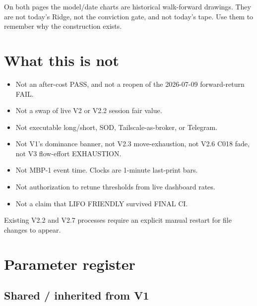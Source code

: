 \documentclass[11pt]{article}
\begin{document}
On both pages the model/date charts are historical walk-forward
drawings.  They are not today's Ridge, not the conviction gate,
and not today's tape.  Use them to remember why the construction
exists.


\section{What this is not}

\begin{itemize}
    \item Not an after-cost PASS, and not a reopen of the
    2026-07-09 forward-return FAIL.
    \item Not a swap of live V2 or V2.2 session fair value.
    \item Not executable long/short, SOD, Tailscale-as-broker, or
    Telegram.
    \item Not V1's dominance banner, not V2.3 move-exhaustion, not
    V2.6 C018 fade, not V3 flow-effort EXHAUSTION.
    \item Not MBP-1 event time.  Clocks are 1-minute last-print
    bars.
    \item Not authorization to retune thresholds from live
    dashboard rates.
    \item Not a claim that LIFO FRIENDLY survived FINAL CI.
\end{itemize}

Existing V2.2 and V2.7 processes require an explicit manual
restart for file changes to appear.


\section{Parameter register}

\subsection{Shared / inherited from V1}
\end{document}

